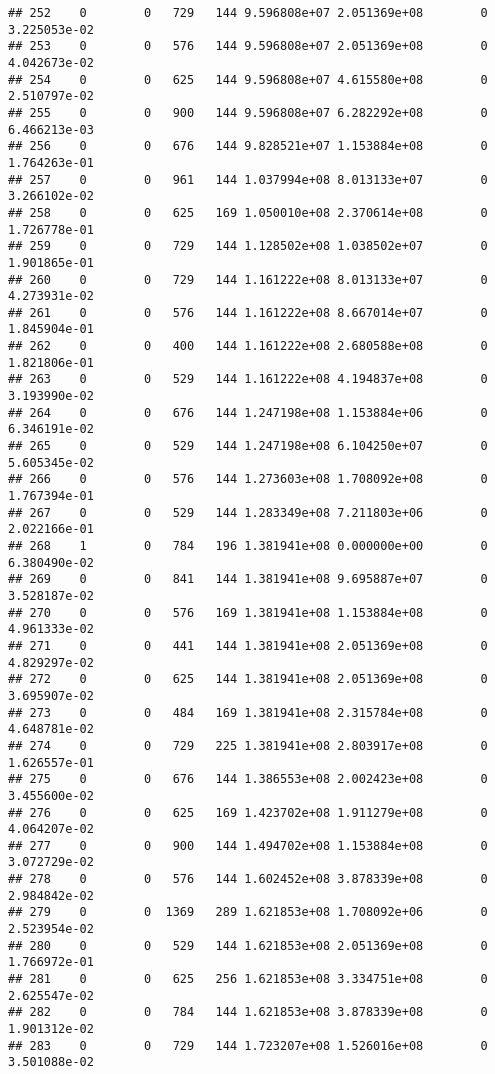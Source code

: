 \documentclass[
]{article}
\begin{document}
\begin{enumerate}
\begin{verbatim}
## 252    0        0   729   144 9.596808e+07 2.051369e+08        0  3.225053e-02
## 253    0        0   576   144 9.596808e+07 2.051369e+08        0  4.042673e-02
## 254    0        0   625   144 9.596808e+07 4.615580e+08        0  2.510797e-02
## 255    0        0   900   144 9.596808e+07 6.282292e+08        0  6.466213e-03
## 256    0        0   676   144 9.828521e+07 1.153884e+08        0  1.764263e-01
## 257    0        0   961   144 1.037994e+08 8.013133e+07        0  3.266102e-02
## 258    0        0   625   169 1.050010e+08 2.370614e+08        0  1.726778e-01
## 259    0        0   729   144 1.128502e+08 1.038502e+07        0  1.901865e-01
## 260    0        0   729   144 1.161222e+08 8.013133e+07        0  4.273931e-02
## 261    0        0   576   144 1.161222e+08 8.667014e+07        0  1.845904e-01
## 262    0        0   400   144 1.161222e+08 2.680588e+08        0  1.821806e-01
## 263    0        0   529   144 1.161222e+08 4.194837e+08        0  3.193990e-02
## 264    0        0   676   144 1.247198e+08 1.153884e+06        0  6.346191e-02
## 265    0        0   529   144 1.247198e+08 6.104250e+07        0  5.605345e-02
## 266    0        0   576   144 1.273603e+08 1.708092e+08        0  1.767394e-01
## 267    0        0   529   144 1.283349e+08 7.211803e+06        0  2.022166e-01
## 268    1        0   784   196 1.381941e+08 0.000000e+00        0  6.380490e-02
## 269    0        0   841   144 1.381941e+08 9.695887e+07        0  3.528187e-02
## 270    0        0   576   169 1.381941e+08 1.153884e+08        0  4.961333e-02
## 271    0        0   441   144 1.381941e+08 2.051369e+08        0  4.829297e-02
## 272    0        0   625   144 1.381941e+08 2.051369e+08        0  3.695907e-02
## 273    0        0   484   169 1.381941e+08 2.315784e+08        0  4.648781e-02
## 274    0        0   729   225 1.381941e+08 2.803917e+08        0  1.626557e-01
## 275    0        0   676   144 1.386553e+08 2.002423e+08        0  3.455600e-02
## 276    0        0   625   169 1.423702e+08 1.911279e+08        0  4.064207e-02
## 277    0        0   900   144 1.494702e+08 1.153884e+08        0  3.072729e-02
## 278    0        0   576   144 1.602452e+08 3.878339e+08        0  2.984842e-02
## 279    0        0  1369   289 1.621853e+08 1.708092e+06        0  2.523954e-02
## 280    0        0   529   144 1.621853e+08 2.051369e+08        0  1.766972e-01
## 281    0        0   625   256 1.621853e+08 3.334751e+08        0  2.625547e-02
## 282    0        0   784   144 1.621853e+08 3.878339e+08        0  1.901312e-02
## 283    0        0   729   144 1.723207e+08 1.526016e+08        0  3.501088e-02

\end{verbatim}
\end{enumerate}
\end{document}
